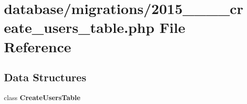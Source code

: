 \section{database/migrations/2015\+\_\+\_\+\_\+\_\+create\+\_\+users\+\_\+table.php File Reference}
\label{2015__03__09__1__create__users__table_8php}
\subsection*{Data Structures}
\begin{DoxyCompactItemize}
\item 
class {\bf Create\+Users\+Table}
\end{DoxyCompactItemize}
